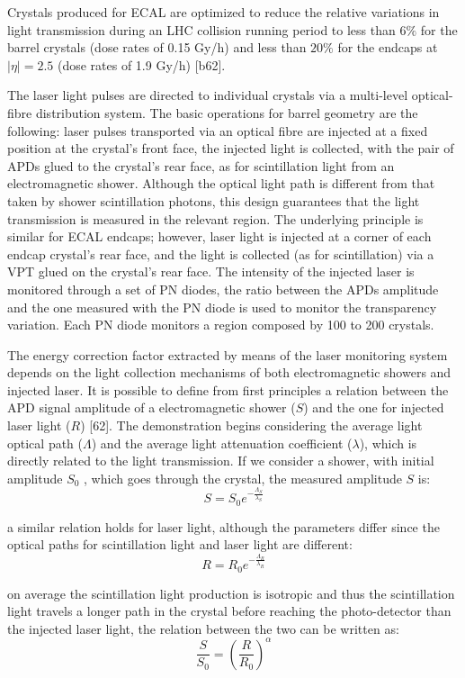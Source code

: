 Crystals produced for ECAL are optimized to reduce the relative variations in light transmission
during an LHC collision running period to less than $6\%$ for the barrel
crystals (dose rates of 0.15 Gy/h) and less than $20\%$ for the endcaps at $|\eta| = 2.5$ (dose rates of
1.9 Gy/h) [b62].

The laser light pulses are directed to individual crystals via a multi-level optical-fibre distribution
system. The basic operations for barrel geometry are the following: laser pulses transported via
an optical fibre are injected at a fixed position at the crystal’s front face, the injected light is
collected, with the pair of APDs glued to the crystal’s rear face, as for scintillation light from an
electromagnetic shower. Although the optical light path is different from that taken by shower
scintillation photons, this design guarantees that the light transmission is measured in the relevant region.
The underlying principle is similar for ECAL endcaps; however, laser light is injected
at a corner of each endcap crystal’s rear face, and the light is collected (as for scintillation) via
a VPT glued on the crystal’s rear face. The intensity of the injected laser is monitored through a set of PN diodes,
the ratio between the APDs amplitude and the one measured with
the PN diode is used to monitor the transparency variation. Each PN diode monitors a region composed by 100 to 200 crystals.

The energy correction factor extracted by means of the laser monitoring system depends on
the light collection mechanisms of both electromagnetic showers and injected laser.
It is possible to define from first principles a relation between
the APD signal amplitude of a electromagnetic shower ($S$) and the one for injected laser light ($R$) [62].
The demonstration begins considering the average light optical path ($\Lambda$) and the average light attenuation
coefficient ($\lambda$), which is directly related to the light transmission. If we consider a shower, with
initial amplitude $S_0$ , which goes through the crystal, the measured amplitude $S$ is:
\[
  S = S_0 e^{-\frac{\Lambda_S}{\lambda_S}}
\]

a similar relation holds for laser light, although the parameters differ since the optical paths for scintillation
light and laser light are different:
\[
  R = R_0 e^{-\frac{\Lambda_R}{\lambda_R}}
\]

on average the scintillation light production is isotropic and thus
the scintillation light travels a longer path in the crystal before reaching the photo-detector than the
injected laser light, the relation between the two can be written as:
\begin{equation}
  \frac{S}{S_0} = \left(\frac{R}{R_0}\right)^{\alpha}
\end{equation}
\label{eq:light_relation}

